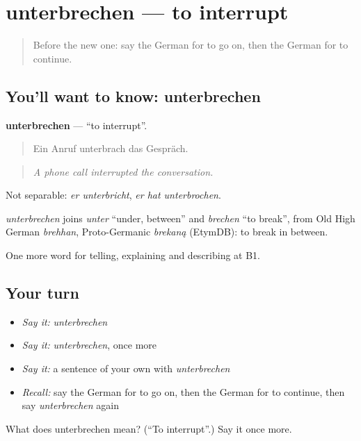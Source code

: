 \section[unterbrechen]{unterbrechen — to interrupt}

\label{lesson:GE-C267-unterbrechen}



\begin{quote}
Before the new one: say the German for to go on, then the German for to continue.
\end{quote}

\subsection*{You'll want to know: unterbrechen}
\textbf{unterbrechen} — \textquotedblleft{}to interrupt\textquotedblright{}.

\begin{quote}
Ein Anruf unterbrach das Gespräch.
\end{quote}

\begin{quote}
\emph{A phone call interrupted the conversation.}
\end{quote}

Not separable: \emph{er unterbricht}, \emph{er hat unterbrochen}.

\begin{cousinweb}
\emph{unterbrechen} joins \emph{unter} \textquotedblleft{}under, between\textquotedblright{} and \emph{brechen} \textquotedblleft{}to break\textquotedblright{}, from Old High German \emph{brehhan}, Proto-Germanic \emph{brekaną} (EtymDB): to break in between.
\end{cousinweb}

\begin{grammarlens}[title={What you've built}]
One more word for telling, explaining and describing at B1.
\end{grammarlens}

\subsection*{Your turn}
\begin{itemize}
\raggedright
  \item \emph{Say it:} \emph{unterbrechen}
  \item \emph{Say it:} \emph{unterbrechen}, once more
  \item \emph{Say it:} a sentence of your own with \emph{unterbrechen}
  \item \emph{Recall:} say the German for to go on, then the German for to continue, then say \emph{unterbrechen} again
\end{itemize}

\begin{tcolorbox}[breakable,colback=teal!4,colframe=teal!35!black,title={Before you move on}]
What does unterbrechen mean? (\textquotedblleft{}To interrupt\textquotedblright{}.) Say it once more.
\end{tcolorbox}
